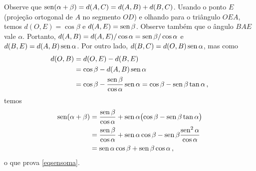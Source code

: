 Observe que $\operatorname{sen}(\alpha+\beta)=d(A,C)=d(A,B)+d(B,C)$.
 Usando o ponto $E$ (projeção ortogonal de $A$ no segmento $OD$) e olhando para o
triângulo $OEA$, temos $d(O,E)=\cos \beta$ e $d(A,E)=\operatorname{sen} \beta$.
Observe também que o ângulo $BAE$ vale $\alpha$.
Portanto, $d(A,B)=d(A,E)/\cos \alpha=\operatorname{sen}\beta/\cos\alpha$ e $d(B,E)=d(A,B)\operatorname{sen} \alpha$.
Por outro lado, $d(B,C)=d(O,B)\operatorname{sen} \alpha$, mas como
\begin{align*}
 d(O,B)&=d(O,E)-d(B,E)\\
&=\cos \beta-d(A,B)\operatorname{sen} \alpha\\
&=\cos \beta-\frac{\operatorname{sen}\beta}{\cos\alpha}\operatorname{sen} \alpha=\cos \beta-\operatorname{sen}  \beta\tan \alpha\,,
\end{align*}
temos
\begin{align*}
 \operatorname{sen}(\alpha+\beta)&=\frac{\operatorname{sen} \beta}{\cos \alpha}+\operatorname{sen} \alpha\bigl(
\cos \beta-\operatorname{sen}  \beta\tan \alpha\bigr)\\
 &=\frac{\operatorname{sen} \beta}{\cos \alpha}+\operatorname{sen} \alpha\cos\beta-\operatorname{sen} \beta\frac{\operatorname{sen}^2\alpha}{\cos
\alpha}\\
&=\operatorname{sen}\alpha\cos\beta+\operatorname{sen}\beta\cos\alpha\,,
\end{align*}
o que prova \eqref{eqsensoma}.\\

